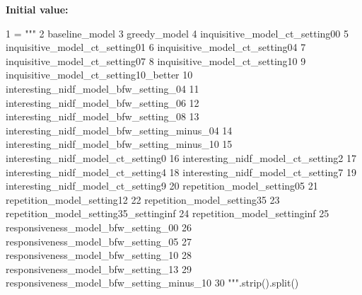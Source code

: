 {\bfseries Initial value\+:}
\begin{DoxyCode}
1 =  \textcolor{stringliteral}{"""}
2 \textcolor{stringliteral}{baseline\_model}
3 \textcolor{stringliteral}{greedy\_model}
4 \textcolor{stringliteral}{inquisitive\_model\_ct\_setting00}
5 \textcolor{stringliteral}{inquisitive\_model\_ct\_setting01}
6 \textcolor{stringliteral}{inquisitive\_model\_ct\_setting04}
7 \textcolor{stringliteral}{inquisitive\_model\_ct\_setting07}
8 \textcolor{stringliteral}{inquisitive\_model\_ct\_setting10}
9 \textcolor{stringliteral}{inquisitive\_model\_ct\_setting10\_better}
10 \textcolor{stringliteral}{interesting\_nidf\_model\_bfw\_setting\_04}
11 \textcolor{stringliteral}{interesting\_nidf\_model\_bfw\_setting\_06}
12 \textcolor{stringliteral}{interesting\_nidf\_model\_bfw\_setting\_08}
13 \textcolor{stringliteral}{interesting\_nidf\_model\_bfw\_setting\_minus\_04}
14 \textcolor{stringliteral}{interesting\_nidf\_model\_bfw\_setting\_minus\_10}
15 \textcolor{stringliteral}{interesting\_nidf\_model\_ct\_setting0}
16 \textcolor{stringliteral}{interesting\_nidf\_model\_ct\_setting2}
17 \textcolor{stringliteral}{interesting\_nidf\_model\_ct\_setting4}
18 \textcolor{stringliteral}{interesting\_nidf\_model\_ct\_setting7}
19 \textcolor{stringliteral}{interesting\_nidf\_model\_ct\_setting9}
20 \textcolor{stringliteral}{repetition\_model\_setting05}
21 \textcolor{stringliteral}{repetition\_model\_setting12}
22 \textcolor{stringliteral}{repetition\_model\_setting35}
23 \textcolor{stringliteral}{repetition\_model\_setting35\_settinginf}
24 \textcolor{stringliteral}{repetition\_model\_settinginf}
25 \textcolor{stringliteral}{responsiveness\_model\_bfw\_setting\_00}
26 \textcolor{stringliteral}{responsiveness\_model\_bfw\_setting\_05}
27 \textcolor{stringliteral}{responsiveness\_model\_bfw\_setting\_10}
28 \textcolor{stringliteral}{responsiveness\_model\_bfw\_setting\_13}
29 \textcolor{stringliteral}{responsiveness\_model\_bfw\_setting\_minus\_10}
30 \textcolor{stringliteral}{"""}.strip().split()
\end{DoxyCode}
